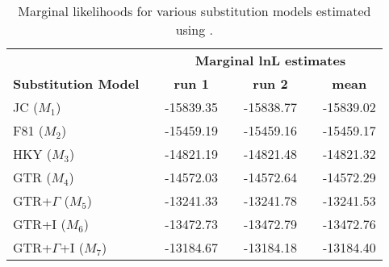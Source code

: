 %
\newpage
\begin{Form}
\begin{table}[h]
\centering
\caption{\small Marginal likelihoods for various substitution models estimated using \MrBayes.}
\begin{tabular}{l c c c c c c}
\hline
\multicolumn{1}{l}{\textbf{ }} &\multicolumn{1}{r}{\textbf{ }} & \multicolumn{5}{c}{\textbf{Marginal lnL estimates}} \\ 
\cline{3-7}
\multicolumn{1}{l}{\textbf{Substitution Model}} & \multicolumn{1}{r}{\hspace{3mm}} & \multicolumn{1}{c}{\textbf{run 1}} & \multicolumn{1}{r}{\hspace{3mm}} & \multicolumn{1}{c}{\textbf{run 2}} & \multicolumn{1}{r}{\hspace{3mm}} & \multicolumn{1}{c}{\textbf{mean}} \\ 
\hline
JC ($M_1$) & \hspace{15mm} 					&-15839.35  		& \hspace{3mm} & -15838.77  		& \hspace{3mm} & -15839.02\\
\hline
F81 ($M_2$) & \hspace{15mm} 				& -15459.19   		& \hspace{3mm} & -15459.16 			& \hspace{3mm} &  -15459.17\\
\hline
HKY ($M_3$) & \hspace{15mm} 				&  -14821.19 		& \hspace{3mm} &  -14821.48  		& \hspace{3mm} & -14821.32 \\
\hline
GTR ($M_4$) & \hspace{15mm} 				& -14572.03  		& \hspace{3mm} &  -14572.64   		& \hspace{3mm} &  -14572.29\\
\hline
GTR+$\Gamma$ ($M_5$) & \hspace{15mm} 		& -13241.33  		& \hspace{3mm} & -13241.78   		& \hspace{3mm} & -13241.53 \\
\hline
GTR+I ($M_6$)  & \hspace{15mm} 				&-13472.73  		& \hspace{3mm} & -13472.79   		& \hspace{3mm} &  -13472.76\\
\hline
GTR+$\Gamma$+I ($M_7$) & \hspace{15mm} 	& -13184.67 		& \hspace{3mm} & -13184.18  		& \hspace{3mm} & -13184.40 \\
\hline
\hline
\end{tabular}
\label{tab:ml_cytb}
\end{table}
\end{Form}

